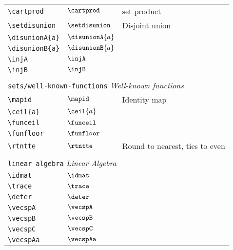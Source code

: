 \begin{longtable}{lll}
 \hline
{\color[rgb]{0.5,0.5,0.5}\texttt{\textbackslash cartprod}} & $\cartprod$ &  set product\\ 
 {\color[rgb]{0.5,0.5,0.5}\texttt{\textbackslash setdisunion}} & $\setdisunion$ &  Disjoint union\\ 
 {\color[rgb]{0.5,0.5,0.5}\texttt{\textbackslash disunionA\{a\}}} & $\disunionA{a}$ & \\ 
 {\color[rgb]{0.5,0.5,0.5}\texttt{\textbackslash disunionB\{a\}}} & $\disunionB{a}$ & \\ 
 {\color[rgb]{0.5,0.5,0.5}\texttt{\textbackslash injA}} & $\injA$ & \\ 
 {\color[rgb]{0.5,0.5,0.5}\texttt{\textbackslash injB}} & $\injB$ & \\ 
  &  & \\ 
 \multicolumn{3}{l}{{\color[rgb]{0.5,0.5,0.5}\texttt{sets/well-known-functions}} \emph{Well-known functions}}\\ 
 \hline
{\color[rgb]{0.5,0.5,0.5}\texttt{\textbackslash mapid}} & $\mapid$ &  Identity map\\ 
 {\color[rgb]{0.5,0.5,0.5}\texttt{\textbackslash ceil\{a\}}} & $\ceil{a}$ & \\ 
 {\color[rgb]{0.5,0.5,0.5}\texttt{\textbackslash funceil}} & $\funceil$ & \\ 
 {\color[rgb]{0.5,0.5,0.5}\texttt{\textbackslash funfloor}} & $\funfloor$ & \\ 
 {\color[rgb]{0.5,0.5,0.5}\texttt{\textbackslash rtntte}} & $\rtntte$ &  Round to nearest, ties to even\\ 
  &  & \\ 
 \multicolumn{3}{l}{{\color[rgb]{0.5,0.5,0.5}\texttt{linear algebra}} \emph{Linear Algebra}}\\ 
 \hline
\hline
{\color[rgb]{0.5,0.5,0.5}\texttt{\textbackslash idmat}} & $\idmat$ & \\ 
 {\color[rgb]{0.5,0.5,0.5}\texttt{\textbackslash trace}} & $\trace$ & \\ 
 {\color[rgb]{0.5,0.5,0.5}\texttt{\textbackslash deter}} & $\deter$ & \\ 
 {\color[rgb]{0.5,0.5,0.5}\texttt{\textbackslash vecspA}} & $\vecspA$ & \\ 
 {\color[rgb]{0.5,0.5,0.5}\texttt{\textbackslash vecspB}} & $\vecspB$ & \\ 
 {\color[rgb]{0.5,0.5,0.5}\texttt{\textbackslash vecspC}} & $\vecspC$ & \\ 
 {\color[rgb]{0.5,0.5,0.5}\texttt{\textbackslash vecspAa}} & $\vecspAa$ & \\ 

\end{longtable}
